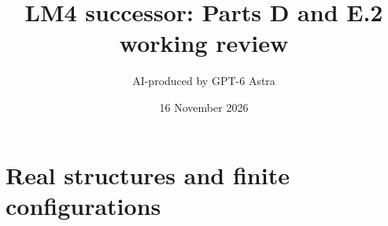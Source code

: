 \documentclass[11pt]{article}
\title{LM4 successor: Parts D and E.2 working review}
\author{AI-produced by GPT-6 Astra}
\date{16 November 2026}
\begin{document}
\maketitle

\section{Real structures and finite configurations}


\end{document}
